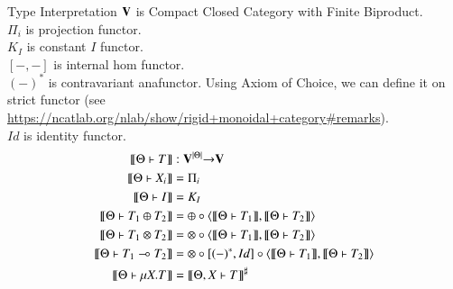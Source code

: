 \documentclass[10pt]{jsarticle}
\newcommand{\semantics}[1]{{\llbracket #1 \rrbracket}}
\begin{document}
\begin{itembox}[c]{Type Interpretation}
$\bf{V}$ is Compact Closed Category with Finite Biproduct.\\
$\Pi_i$ is projection functor. \\
$K_I$ is constant $I$ functor. \\
$[-,-]$ is internal hom functor. \\
$(-)^\ast$ is contravariant anafunctor. Using Axiom of Choice, we can define it on strict functor (see \url{https://ncatlab.org/nlab/show/rigid+monoidal+category#remarks}). \\
$Id$ is identity functor.
  \begin{align*}
    \semantics{\Theta \vdash T}                 &: {\bf V}^{|\Theta|} {\bf\rightarrow} {\bf V} \\
    \semantics{\Theta \vdash X_i}               &= \Pi_i \\
    \semantics{\Theta \vdash I}                 &= K_I \\
    \semantics{\Theta \vdash T_1\oplus{}T_2}    &= \oplus\circ\langle\semantics{\Theta \vdash T_1},\semantics{\Theta \vdash T_2}\rangle \\
    \semantics{\Theta \vdash T_1\otimes{}T_2}   &= \otimes\circ\langle\semantics{\Theta \vdash T_1},\semantics{\Theta \vdash T_2}\rangle \\
    \semantics{\Theta \vdash T_1\multimap{}T_2} &= \otimes\circ[(-)^\ast,Id]\circ\langle\semantics{\Theta \vdash T_1},\semantics{\Theta \vdash T_2}\rangle \\
    \semantics{\Theta \vdash \mu{X}.T}          &= \semantics{\Theta,X \vdash T}^\sharp
  \end{align*}
\end{itembox}
\end{document}
